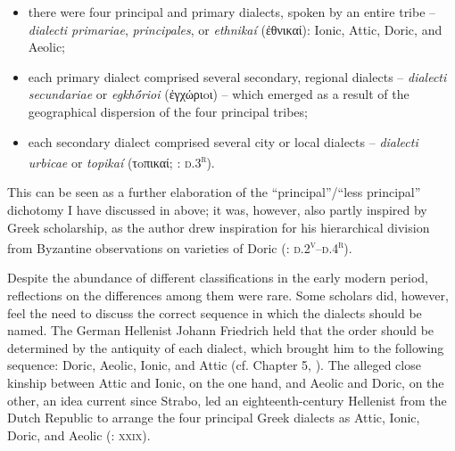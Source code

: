 \begin{itemize}
\item there were four principal and primary dialects, spoken by an entire tribe – \textit{dialecti primariae}, \textit{principales}, or \textit{ethnikaí} (ἐθνικαί): Ionic, Attic, Doric, and Aeolic;

\item each primary dialect comprised several secondary, regional dialects – \textit{dialecti secundariae} or \textit{egkhṓrioi} (ἐγχώριoι) – which emerged as a result of the geographical dispersion of the four principal tribes;

\item each secondary dialect comprised several city or local dialects – \textit{dialecti urbicae} or \textit{topikaí} (τoπικαί; \citealt{Thryllitsch1709}: \textsc{d.3}\textsc{\textsuperscript{r}}).

\end{itemize}

This can be seen as a further elaboration of the “principal”/“less principal” dichotomy I have discussed in  above; it was, however, also partly inspired by Greek scholarship, as the author drew inspiration for his hierarchical division from Byzantine observations on varieties of Doric (\citealt{Thryllitsch1709}: \textsc{d.2}\textsc{\textsuperscript{v}}\textsc{–d.4}\textsc{\textsuperscript{r}}).

Despite the abundance of different classifications in the early modern period, reflections on the differences among them were rare. Some scholars did, however, feel the need to discuss the correct sequence in which the dialects should be named. The German Hellenist Johann Friedrich \citet[\textsc{iv}]{Facius1782} held that the order should be determined by the antiquity of each dialect, which brought him to the following sequence: Doric, Aeolic, Ionic, and Attic (cf. Chapter 5, ). The alleged close kinship between Attic and Ionic, on the one hand, and Aeolic and Doric, on the other, an idea current since Strabo, led an eighteenth-century Hellenist from the Dutch Republic to arrange the four principal Greek dialects as Attic, Ionic, Doric, and Aeolic (\citealt{Koen1766}: \textsc{xxix}).

